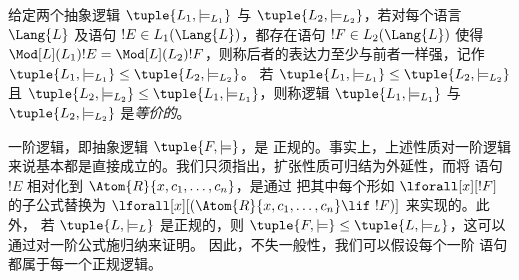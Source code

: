 \documentclass[../../../include/open-logic-section]{subfiles}
\begin{document}
\begin{defn}
给定两个抽象逻辑 $\tuple{L_1, \models_{L_1}}$ 与
$\tuple{L_2, \models_{L_2}}$，若对每个语言 $\Lang{L}$
及语句 $!E \in L_1(\Lang{L})$，都存在语句 $!F
\in L_2(\Lang{L})$ 使得 $\Mod[L](L_1){!E} =
\Mod[L](L_2){!F}$，则称后者的表达力至少与前者一样强，记作 $\tuple{L_1, \models_{L_1}}
\leq \tuple{L_2, \models_{L_2}}$。
若 $\tuple{L_1,
  \models_{L_1}} \leq \tuple{L_2, \models_{L_2}}$ 且 $\tuple{L_2,
  \models_{L_2}} \leq \tuple{L_1, \models_{L_1}}$，则称逻辑 $\tuple{L_1, \models_{L_1}}$ 与
$\tuple{L_2, \models_{L_2}}$ 是\emph{等价的}。
\end{defn}

\begin{rem}
  一阶逻辑，即抽象逻辑 $\tuple{F, \models}$，是
  正规的。事实上，上述性质对一阶逻辑来说基本都是直接成立的。我们只须指出，扩张性质可归结为外延性，而将
  语句 $!E$ 相对化到 $\Atom{R}{x, c_1, \dots, c_n}$，是通过
  把其中每个形如 $\lforall[x][!F]$ 的子公式替换为
  $\lforall[x][(\Atom{R}{x, c_1, \dots, c_n} \lif \ !F)]$ 来实现的。此外，
  若 $\tuple{L, \models_L}$ 是正规的，则
  $\tuple{F, \models} \leq \tuple{L, \models_{L}}$，这可以通过对一阶公式施归纳来证明。
  因此，不失一般性，我们可以假设每个一阶
  语句都属于每一个正规逻辑。
\end{rem}
\end{document}
